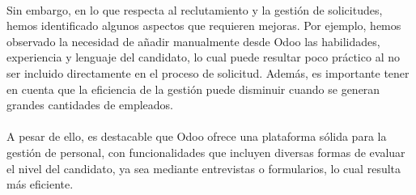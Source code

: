 \paragraph{}
Sin embargo, en lo que respecta al reclutamiento y la gestión de solicitudes, hemos identificado algunos aspectos que requieren mejoras. Por ejemplo, hemos observado la necesidad de añadir manualmente desde Odoo las habilidades, experiencia y lenguaje del candidato, lo cual puede resultar poco práctico al no ser incluido directamente en el proceso de solicitud. Además, es importante tener en cuenta que la eficiencia de la gestión puede disminuir cuando se generan grandes cantidades de empleados.
\paragraph{}
A pesar de ello, es destacable que Odoo ofrece una plataforma sólida para la gestión de personal, con funcionalidades que incluyen diversas formas de evaluar el nivel del candidato, ya sea mediante entrevistas o formularios, lo cual resulta más eficiente.